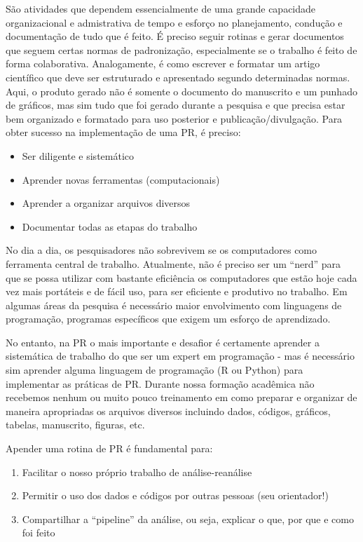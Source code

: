 \documentclass[]{book}
\providecommand{\tightlist}{%
  \setlength{\itemsep}{0pt}\setlength{\parskip}{0pt}}
\begin{document}
São atividades que dependem essencialmente de uma grande capacidade
organizacional e admistrativa de tempo e esforço no planejamento,
condução e documentação de tudo que é feito. É preciso seguir rotinas e
gerar documentos que seguem certas normas de padronização, especialmente
se o trabalho é feito de forma colaborativa. Analogamente, é como
escrever e formatar um artigo científico que deve ser estruturado e
apresentado segundo determinadas normas. Aqui, o produto gerado não é
somente o documento do manuscrito e um punhado de gráficos, mas sim tudo
que foi gerado durante a pesquisa e que precisa estar bem organizado e
formatado para uso posterior e publicação/divulgação. Para obter sucesso
na implementação de uma PR, é preciso:

\begin{itemize}
\tightlist
\item
  Ser diligente e sistemático
\item
  Aprender novas ferramentas (computacionais)
\item
  Aprender a organizar arquivos diversos
\item
  Documentar todas as etapas do trabalho
\end{itemize}

No dia a dia, os pesquisadores não sobrevivem se os computadores como
ferramenta central de trabalho. Atualmente, não é preciso ser um
``nerd'' para que se possa utilizar com bastante eficiência os
computadores que estão hoje cada vez mais portáteis e de fácil uso, para
ser eficiente e produtivo no trabalho. Em algumas áreas da pesquisa é
necessário maior envolvimento com linguagens de programação, programas
específicos que exigem um esforço de aprendizado.

No entanto, na PR o mais importante e desafior é certamente aprender a
sistemática de trabalho do que ser um expert em programação - mas é
necessário sim aprender alguma linguagem de programação (R ou Python)
para implementar as práticas de PR. Durante nossa formação acadêmica não
recebemos nenhum ou muito pouco treinamento em como preparar e organizar
de maneira apropriadas os arquivos diversos incluindo dados, códigos,
gráficos, tabelas, manuscrito, figuras, etc.

Apender uma rotina de PR é fundamental para:

\begin{enumerate}
\def\labelenumi{\arabic{enumi})}
\tightlist
\item
  Facilitar o nosso próprio trabalho de análise-reanálise
\item
  Permitir o uso dos dados e códigos por outras pessoas (seu
  orientador!)
\item
  Compartilhar a ``pipeline'' da análise, ou seja, explicar o que, por
  que e como foi feito
\end{enumerate}
\end{document}
